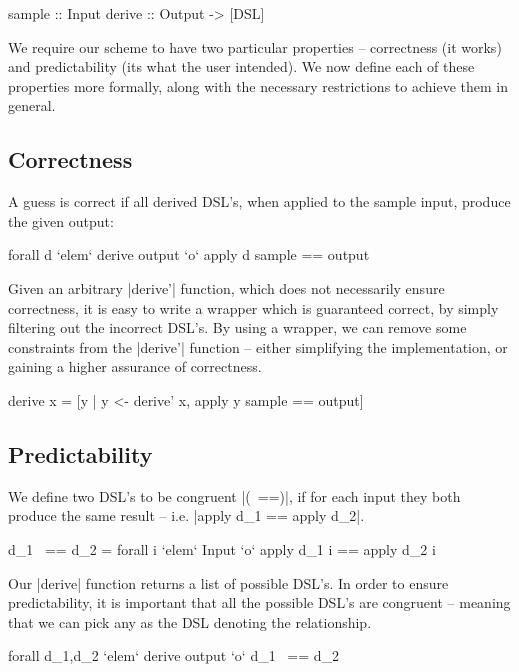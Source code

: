 \documentclass[preprint]{sigplanconf}
\begin{document}
\begin{code}
sample :: Input
derive :: Output -> [DSL]
\end{code}

We require our scheme to have two particular properties -- correctness (it works) and predictability (its what the user intended). We now define each of these properties more formally, along with the necessary restrictions to achieve them in general.

\subsection{Correctness}

A guess is correct if all derived DSL's, when applied to the sample input, produce the given output:

\ignore\begin{code}
forall d `elem` derive output `o` apply d sample == output
\end{code}

Given an arbitrary |derive'| function, which does not necessarily ensure correctness, it is easy to write a wrapper which is guaranteed correct, by simply filtering out the incorrect DSL's. By using a wrapper, we can remove some constraints from the |derive'| function -- either simplifying the implementation, or gaining a higher assurance of correctness.

\begin{code}
derive x = [y | y <- derive' x, apply y sample == output]
\end{code}

\subsection{Predictability}

We define two DSL's to be congruent |(~==)|, if for each input they both produce the same result -- i.e. |apply d_1 == apply d_2|.

\ignore\begin{code}
d_1 ~== d_2 = forall i `elem` Input `o` apply d_1 i == apply d_2 i
\end{code}

Our |derive| function returns a list of possible DSL's. In order to ensure predictability, it is important that all the possible DSL's are congruent -- meaning that we can pick any as the DSL denoting the relationship.

\ignore\begin{code}
forall d_1,d_2 `elem` derive output `o` d_1 ~== d_2
\end{code}
\end{document}
